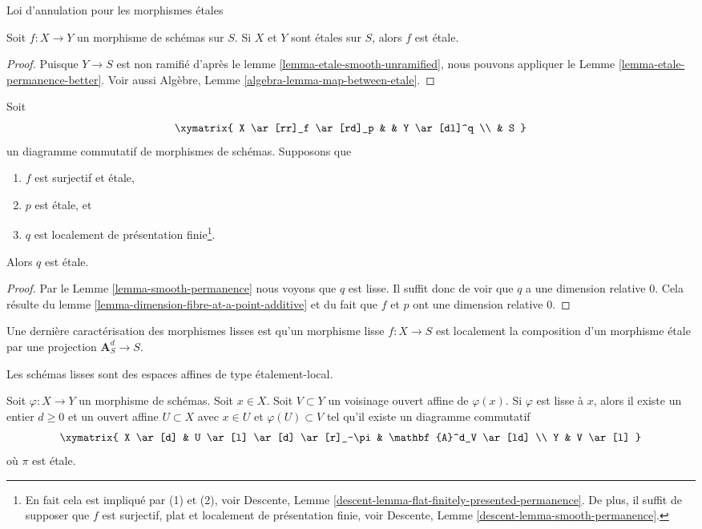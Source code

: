 \begin{lemma}
\label{lemma-etale-permanence}
\begin{slogan}
Loi d'annulation pour les morphismes étales
\end{slogan}
Soit $f : X \to Y$ un morphisme de schémas sur $S$. Si $X$ et $Y$
sont étales sur $S$, alors $f$
est étale.
\end{lemma}

\begin{proof}
Puisque $Y \to S$ est non ramifié d'après le lemme \ref{lemma-etale-smooth-unramified},
nous pouvons appliquer le Lemme \ref{lemma-etale-permanence-better}.
Voir aussi Algèbre, Lemme \ref{algebra-lemma-map-between-etale}.
\end{proof}

\begin{lemma}
\label{lemma-etale-permanence-two}
Soit
$$
\xymatrix{
X \ar[rr]_f \ar[rd]_p & &
Y \ar[dl]^q \\
& S
}
$$
un diagramme commutatif de morphismes de schémas. Supposons que
\begin{enumerate}
\item $f$ est surjectif et étale,
\item $p$ est étale, et
\item $q$ est localement de présentation finie\footnote{En
fait cela
est impliqué par (1) et (2), voir Descente, Lemme \ref{descent-lemma-flat-finitely-presented-permanence}. De plus,
il suffit de supposer que $f$ est surjectif, plat
et localement de présentation
finie, voir Descente, Lemme \ref{descent-lemma-smooth-permanence}.}.
\end{enumerate}
Alors $q$ est étale.
\end{lemma}

\begin{proof}
Par le Lemme \ref{lemma-smooth-permanence} nous voyons que $q$ est lisse. Il suffit
donc de voir que $q$ a une dimension relative
$0$. Cela résulte du lemme \ref{lemma-dimension-fibre-at-a-point-additive} et du fait que $f$
et $p$ ont une dimension relative $0$.
\end{proof}

\noindent
Une dernière caractérisation des morphismes lisses est qu'un morphisme lisse
$f : X \to S$ est localement la composition d'un morphisme étale par une
projection $\mathbf{A}_S^d \to S$.

\begin{lemma}
\label{lemma-smooth-etale-over-affine-space}
\begin{slogan}
Les schémas lisses sont des espaces affines de type étalement-local.
\end{slogan}
Soit $\varphi : X \to Y$ un morphisme de schémas. Soit $x \in X$. Soit
$V \subset Y$ un voisinage ouvert affine de $\varphi(x)$. Si $\varphi$
est lisse à $x$, alors il existe un entier $d \geq 0$
et un ouvert affine $U \subset X$ avec $x \in U$
et $\varphi(U) \subset V$ tel qu'il existe un diagramme commutatif
$$
\xymatrix{
X \ar[d] & U \ar[l] \ar[d] \ar[r]_-\pi & \mathbf{A}^d_V \ar[ld] \\
Y & V \ar[l]
}
$$
où $\pi$ est étale.
\end{lemma}

